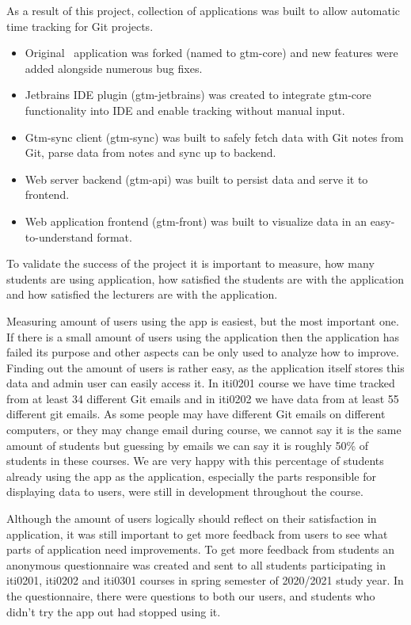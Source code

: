 As a result of this project, collection of applications was built to allow automatic time tracking for Git projects.
\begin{itemize}
    \item Original~ application was forked (named to gtm-core) and new features were added
    alongside numerous bug fixes.
    \item Jetbrains IDE plugin (gtm-jetbrains) was created to integrate gtm-core functionality into IDE and enable tracking without manual input.
    \item Gtm-sync client (gtm-sync) was built to safely fetch data with Git notes from Git, parse data from notes and sync up to backend.
    \item Web server backend (gtm-api) was built to persist data and serve it to frontend.
    \item Web application frontend (gtm-front) was built to visualize data in an easy-to-understand format.
\end{itemize}

To validate the success of the project it is important to measure, how many students are using application,
how satisfied the students are with the application and how satisfied the lecturers are with the application.

Measuring amount of users using the app is easiest, but the most important one.
If there is a small amount of users using the application then the application has failed its purpose and other
aspects can be only used to analyze how to improve.
Finding out the amount of users is rather easy, as the application itself stores this data and admin user can easily access it.
In iti0201 course we have time tracked from at least 34 different Git emails and in iti0202 we have data from at least 55 different git emails.
As some people may have different Git emails on different computers, or they may change email during course, we cannot say it
is the same amount of students but guessing by emails we can say it is roughly 50\% of students in these courses.
We are very happy with this percentage of students already using the app as the application, especially the parts
responsible for displaying data to users, were still in development throughout the course.

Although the amount of users logically should reflect on their satisfaction in application, it was still important to
get more feedback from users to see what parts of application need improvements.
To get more feedback from students an anonymous questionnaire was created and sent to all students participating in iti0201, iti0202
and iti0301 courses in spring semester of 2020/2021 study year.
In the questionnaire, there were questions to both our users, and students who didn't try the app out had stopped using it.

